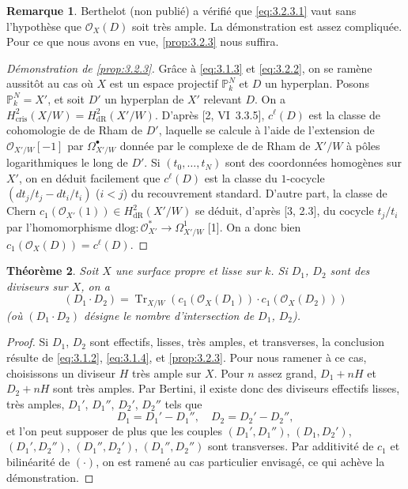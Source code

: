 \documentclass[12pt,a4paper]{article}
\theoremstyle{plain}
\newtheorem{theorem}{Théorème}[section]
\theoremstyle{definition}
\newtheorem{remark}[theorem]{Remarque}
\theoremstyle{remark}
\DeclareMathOperator{\Tr}{Tr}
\newcommand{\dlog}{\mathrm{dlog}}
\newcommand{\cris}{\mathrm{cris}}
\begin{document}
\begin{remark}\label{rem:3.2.4}
Berthelot (non publié) a vérifié que \eqref{eq:3.2.3.1} vaut sans l'hypothèse que $\mathcal{O}_X(D)$ soit très ample. La démonstration est assez compliquée. Pour ce que nous avons en vue, \ref{prop:3.2.3} nous suffira.
\end{remark}

\begin{proof}[Démonstration de \ref{prop:3.2.3}]
Grâce à \eqref{eq:3.1.3} et \eqref{eq:3.2.2}, on se ramène aussitôt au cas où $X$ est un espace projectif $\mathbb{P}^N_k$ et $D$ un hyperplan. Posons $\mathbb{P}^N_k = X'$, et soit $D'$ un hyperplan de $X'$ relevant $D$. On a $H^2_{\cris}(X/W) = H^2_{\mathrm{dR}}(X'/W)$. D'après [2, VI~3.3.5], $c^{\ell}(D)$ est la classe de cohomologie de de Rham de $D'$, laquelle se calcule à l'aide de l'extension de $\mathcal{O}_{X'/W}[-1]$ par $\Omega^{\bullet}_{X'/W}$ donnée par le complexe de de Rham de $X'/W$ à pôles logarithmiques le long de $D'$. Si $(t_0, \ldots, t_N)$ sont des coordonnées homogènes sur $X'$, on en déduit facilement que $c^{\ell}(D)$ est la classe du $1$-cocycle $(dt_j/t_j - dt_i/t_i)$ ($i < j$) du recouvrement standard. D'autre part, la classe de Chern $c_1(\mathcal{O}_{X'}(1)) \in H^2_{\mathrm{dR}}(X'/W)$ se déduit, d'après [3, 2.3], du cocycle $t_j/t_i$ par l'homomorphisme $\dlog: \mathcal{O}_{X'}^* \to \Omega^1_{X'/W}$ [1]. On a donc bien $c_1(\mathcal{O}_X(D)) = c^{\ell}(D)$.
\end{proof}

\begin{theorem}\label{thm:3.3}
Soit $X$ une surface propre et lisse sur $k$. Si $D_1$, $D_2$ sont des diviseurs sur $X$, on a
\[
(D_1 \cdot D_2) = \Tr_{X/W}(c_1(\mathcal{O}_X(D_1)) \cdot c_1(\mathcal{O}_X(D_2)))
\]
(où $(D_1 \cdot D_2)$ désigne le nombre d'intersection de $D_1$, $D_2$).
\end{theorem}

\begin{proof}
Si $D_1$, $D_2$ sont effectifs, lisses, très amples, et transverses, la conclusion résulte de \eqref{eq:3.1.2}, \eqref{eq:3.1.4}, et \ref{prop:3.2.3}. Pour nous ramener à ce cas, choisissons un diviseur $H$ très ample sur $X$. Pour $n$ assez grand, $D_1 + nH$ et $D_2 + nH$ sont très amples. Par Bertini, il existe donc des diviseurs effectifs lisses, très amples, $D_1'$, $D_1''$, $D_2'$, $D_2''$ tels que
\[
D_1 = D_1' - D_1'', \quad D_2 = D_2' - D_2'',
\]
et l'on peut supposer de plus que les couples $(D_1', D_1'')$, $(D_1, D_2')$, $(D_1', D_2'')$, $(D_1'', D_2')$, $(D_1'', D_2'')$ sont transverses. Par additivité de $c_1$ et bilinéarité de $(\cdot)$, on est ramené au cas particulier envisagé, ce qui achève la démonstration.
\end{proof}
\end{document}
